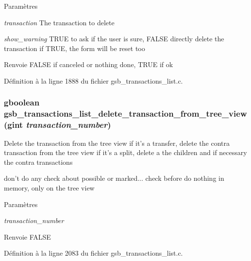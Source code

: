 \begin{DoxyParams}{Paramètres}
\item[{\em transaction}]The transaction to delete \item[{\em show\_\-warning}]TRUE to ask if the user is sure, FALSE directly delete the transaction if TRUE, the form will be reset too\end{DoxyParams}
\begin{DoxyReturn}{Renvoie}
FALSE if canceled or nothing done, TRUE if ok 
\end{DoxyReturn}


Définition à la ligne 1888 du fichier gsb\_\-transactions\_\-list.c.

\subsubsection[{gsb\_\-transactions\_\-list\_\-delete\_\-transaction\_\-from\_\-tree\_\-view}]{\setlength{\rightskip}{0pt plus 5cm}gboolean gsb\_\-transactions\_\-list\_\-delete\_\-transaction\_\-from\_\-tree\_\-view (gint {\em transaction\_\-number})}\label{gsb__transactions__list_8h_af4607ecfa510ff666ad6f3a12b898e4f}
Delete the transaction from the tree view if it's a transfer, delete the contra transaction from the tree view if it's a split, delete a the children and if necessary the contra transactions

don't do any check about possible or marked... check before do nothing in memory, only on the tree view


\begin{DoxyParams}{Paramètres}
\item[{\em transaction\_\-number}]\end{DoxyParams}
\begin{DoxyReturn}{Renvoie}
FALSE 
\end{DoxyReturn}


Définition à la ligne 2083 du fichier gsb\_\-transactions\_\-list.c.

